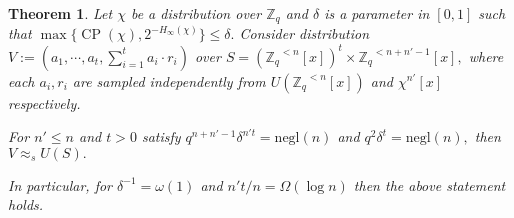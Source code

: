\documentclass[11pt]{article}
\newcommand{\poly}[2]{{#1}^{<#2}[x]}
\newcommand{\negl}[1]{\text{negl}(#1)}
\newcommand{\Z}{\mathbb{Z}}
\newtheorem{theorem}{Theorem}[section]
\newtheorem{definition}{Definition}[section]
\DeclareMathOperator{\cp}{CP}
\begin{document}
\begin{theorem} \label{thm:lhl}
Let $\chi$ be a distribution over $\Z_q$ and $\delta$ is a parameter in  $[0,1]$  such that $\max \{ \cp(\chi), 2^{-H_{\infty}(\chi)} \} \leq \delta. $ Consider distribution $V:= (a_1, \cdots, a_t, \sum_{i=1}^t a_i \cdot r_i)$ over $S = (\poly{\Z_q}{n})^t \times \poly{\Z_q}{n+n'-1},$ where each $a_i, r_i$ are sampled independently from $U(\poly{\Z_q}{n})$ and $\chi^{n'}[x]$ respectively.

For $n' \leq n$ and $t > 0 $ satisfy $q^{n+n'-1} \delta^{n' t} =\negl{n}$ and $q^2 \delta^t = \negl{n},$ then $V \approx_s U(S).$

In particular, for $ \delta^{-1} = \omega(1)$ and $n't/n = \Omega(\log n)$ then the above statement holds.
\end{theorem}
\end{document}
